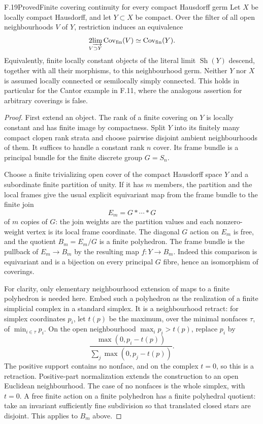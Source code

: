 \begin{statement}{F.19}{Proved}{Finite covering continuity for every compact Hausdorff germ}
Let $X$ be locally compact Hausdorff, and let $Y\subset X$ be
compact. Over the filter of all open neighbourhoods $V$ of $Y$,
restriction induces an equivalence
\[
 \operatorname*{2\!\varinjlim}_{V\supset Y}
      \operatorname{Cov}_{\mathrm{fin}}(V)
        \simeq \operatorname{Cov}_{\mathrm{fin}}(Y).
\]
Equivalently, finite locally constant objects of the literal limit
$\operatorname{Sh}(Y)$ descend, together with all their morphisms,
to this neighbourhood germ. Neither $Y$ nor $X$ is assumed locally
connected or semilocally simply connected. This holds in particular
for the Cantor example in F.11, where the analogous assertion for
arbitrary coverings is false.
\end{statement}
\begin{proof}
First extend an object. The rank of a finite covering on $Y$ is
locally constant and has finite image by compactness. Split $Y$
into its finitely many compact clopen rank strata and choose
pairwise disjoint ambient neighbourhoods of them. It suffices to
handle a constant rank $n$ cover. Its frame bundle is a principal
bundle for the finite discrete group $G=S_n$.

Choose a finite trivializing open cover of the compact Hausdorff
space $Y$ and a subordinate finite partition of unity. If it has
$m$ members, the partition and the local frames give the usual
explicit equivariant map from the frame bundle to the finite join
\[
                         E_m=G*\cdots*G
\]
of $m$ copies of $G$: the join weights are the partition values
and each nonzero-weight vertex is its local frame coordinate.
The diagonal $G$ action on $E_m$ is free, and the quotient
$B_m=E_m/G$ is a finite polyhedron. The frame bundle is the
pullback of $E_m\to B_m$ by the resulting map $f:Y\to B_m$.
Indeed this comparison is equivariant and is a bijection on
every principal $G$ fibre, hence an isomorphism of coverings.

For clarity, only elementary neighbourhood extension of maps to
a finite polyhedron is needed here. Embed such a polyhedron as
the realization of a finite simplicial complex in a standard
simplex. It is a neighbourhood retract: for simplex coordinates
$p_i$, let $t(p)$ be the maximum, over the minimal nonfaces
$\tau$, of $\min_{i\in\tau}p_i$. On the open neighbourhood
$\max_i p_i>t(p)$, replace $p_i$ by
\[
             \frac{\max(0,p_i-t(p))}
                  {\sum_j\max(0,p_j-t(p))}.
\]
The positive support contains no nonface, and on the complex
$t=0$, so this is a retraction. Positive-part normalization
extends the construction to an open Euclidean neighbourhood.
The case of no nonfaces is the whole simplex, with $t=0$.
A free finite action on a finite polyhedron has a finite
polyhedral quotient: take an invariant sufficiently fine
subdivision so that translated closed stars are disjoint.
This applies to $B_m$ above.


\end{proof}
